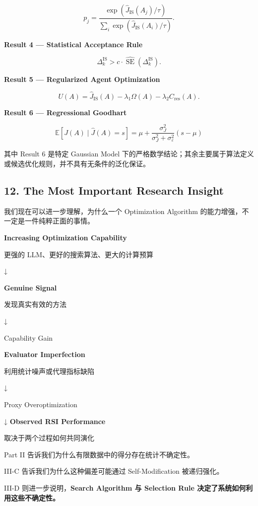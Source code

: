 \[p_j=
\frac{\exp(\widehat J_{\mathrm{IS}}(A_j)/\tau)}
{\sum_i\exp(\widehat J_{\mathrm{IS}}(A_i)/\tau)}.\]

\textbf{Result 4 --- Statistical Acceptance Rule}

\[\Delta_k^{\mathrm{IS}}
>
c\cdot
\widehat{\operatorname{SE}}(\Delta_k^{\mathrm{IS}}).\]

\textbf{Result 5 --- Regularized Agent Optimization}

\[U(A)=\widehat J_{\mathrm{IS}}(A)
-\lambda_1\Omega(A)
-\lambda_2C_{\mathrm{res}}(A).\]

\textbf{Result 6 --- Regressional Goodhart}

\[\boxed{
\mathbb E[J(A)\mid\widehat J(A)=s]
=
\mu+
\frac{\sigma_J^2}
{\sigma_J^2+\sigma_\varepsilon^2}
(s-\mu)
}\]

其中 Result 6 是特定 Gaussian Model 下的严格数学结论；其余主要属于算法定义或候选优化规则，并不具有无条件的泛化保证。

\hypertarget{part-3-40-0001-the-most-important-research-insight}{%
\subsection{12. The Most Important Research Insight}\label{part-3-40-0001-the-most-important-research-insight}}

我们现在可以进一步理解，为什么一个 Optimization Algorithm 的能力增强，不一定是一件纯粹正面的事情。

\textbf{Increasing Optimization Capability}

更强的 LLM、更好的搜索算法、更大的计算预算

↓

\textbf{Genuine Signal}

发现真实有效的方法

↓

Capability Gain

\textbf{Evaluator Imperfection}

利用统计噪声或代理指标缺陷

↓

Proxy Overoptimization

↓ \textbf{Observed RSI Performance}

取决于两个过程如何共同演化

Part II 告诉我们为什么有限数据中的得分存在统计不确定性。

III-C 告诉我们为什么这种偏差可能通过 Self-Modification 被递归强化。

III-D 则进一步说明，\textbf{Search Algorithm 与 Selection Rule 决定了系统如何利用这些不确定性。}

